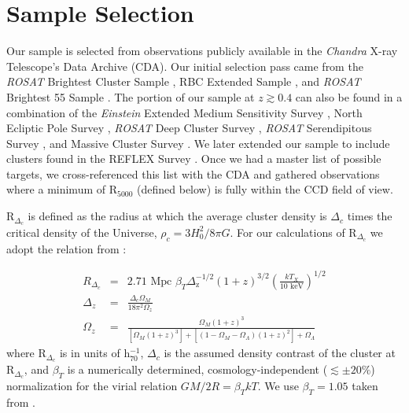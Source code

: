 \documentclass{emulateapj}
\newcommand{\chan}{{\textit{Chandra }}}
\begin{document}
\section{Sample Selection} \label{sec:selection}

Our sample is selected from observations publicly available in the
\chan X-ray Telescope's Data Archive (CDA). Our initial
selection pass came from the {\textit{ROSAT}} Brightest Cluster Sample
\citep{1998MNRAS.301..881E}, RBC Extended Sample
\citep{2000MNRAS.318..333E}, and {\textit{ROSAT}} Brightest 55 Sample
\citep{1990MNRAS.245..559E, 1998MNRAS.298..416P}. The portion of our
sample at $z \gtrsim 0.4$ can also be found in a combination of the
{\textit{Einstein}} Extended Medium Sensitivity Survey
\citep{1990ApJS...72..567G}, North Ecliptic Pole Survey
\citep{2006ApJS..162..304H}, {\textit{ROSAT}} Deep Cluster Survey
\citep{1995ApJ...445L..11R}, {\textit{ROSAT}} Serendipitous Survey
\citep{1998ApJ...502..558V}, and Massive Cluster Survey
\citep{2001ApJ...553..668E}. We later extended our sample to include
clusters found in the REFLEX Survey \citep{2004A&A...425..367B}. Once
we had a master list of possible targets, we cross-referenced this
list with the CDA and gathered observations where a minimum of
R$_{5000}$ (defined below) is fully within the CCD field of
view.

R$_{\Delta_c}$ is defined as the radius at which the average cluster
density is $\Delta_c$ times the critical density of the Universe,
$\rho_c=3H_{0}^2/8\pi G$. For our calculations of R$_{\Delta_c}$ we
adopt the relation from \cite{2002A&A...389....1A}:

\begin{eqnarray}
R_{\Delta_c} &=& 2.71 \text{ Mpc }
\beta_T
\Delta_{\text{z}}^{-1/2}
(1+z)^{3/2}
(\frac{kT_X}{10 \text{ keV}})^{1/2}\\
\Delta_z &=& \frac{\Delta_c \Omega_M}{18\pi^2\Omega_z} \nonumber \\
\Omega_z &=& \frac{\Omega_M (1+z)^3}{[\Omega_M
(1+z)^3]+[(1-\Omega_M-\Omega_{\Lambda})(1+z)^2]+\Omega_{\Lambda}} \nonumber
\end{eqnarray}
where R$_{\Delta_c}$ is in units of h$_{70}^{-1}$, $\Delta_c$ is
the assumed density contrast of the cluster at R$_{\Delta_c}$, and
$\beta_T$ is a numerically determined, cosmology-independent
($\lesssim \pm 20\%$) normalization for the virial relation $GM/2R =
\beta_TkT$. We use $\beta_T = 1.05$ taken from
\cite{1996ApJ...469..494E}.
\end{document}
